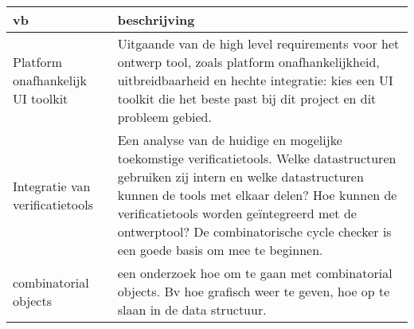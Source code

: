\begin{center}
    \begin{tabular}{|p{2.5cm}|p{10cm}|}
    \hline
        {\bf vb}		& {\bf beschrijving} \\\hline

Platform onafhankelijk UI toolkit &
Uitgaande van de high level requirements voor het ontwerp tool, zoals platform
onafhankelijkheid, uitbreidbaarheid en hechte integratie: kies een UI
toolkit die het beste past bij dit project en dit probleem gebied.\\\hline

Integratie van verificatietools &
Een analyse van de huidige en mogelijke toekomstige verificatietools. Welke
datastructuren gebruiken zij intern en welke datastructuren kunnen de tools
met elkaar delen? Hoe kunnen de verificatietools worden ge\"integreerd met
de ontwerptool? De combinatorische cycle checker is een goede basis om mee
te beginnen.\\\hline

combinatorial objects &
een onderzoek hoe om te gaan met combinatorial objects. Bv hoe grafisch weer
te geven, hoe op te slaan in de data structuur.\\\hline

    \end{tabular}
\end{center}



